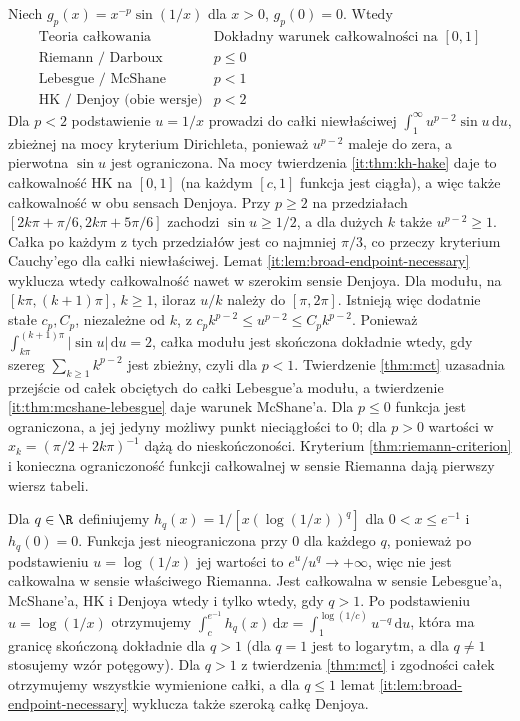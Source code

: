 \begin{przyklad}
Niech $g_p(x)=x^{-p}\sin(1/x)$ dla $x>0$, $g_p(0)=0$. Wtedy
\[
\begin{array}{c|c}
\text{Teoria całkowania}&\text{Dokładny warunek całkowalności na }[0,1]\\\hline
\text{Riemann / Darboux}&p\le0\\
\text{Lebesgue / McShane}&p<1\\
\text{HK / Denjoy (obie wersje)}&p<2
\end{array}
\]
Dla $p<2$ podstawienie $u=1/x$ prowadzi do całki niewłaściwej $\int_1^\infty u^{p-2}\sin u\,\mathrm du$, zbieżnej na mocy kryterium Dirichleta, ponieważ $u^{p-2}$ maleje do zera, a pierwotna $\sin u$ jest ograniczona. Na mocy twierdzenia \ref{it:thm:kh-hake} daje to całkowalność HK na $[0,1]$ (na każdym $[c,1]$ funkcja jest ciągła), a więc także całkowalność w obu sensach Denjoya. Przy $p\ge2$ na przedziałach $[2k\pi+\pi/6,2k\pi+5\pi/6]$ zachodzi $\sin u\ge1/2$, a dla dużych $k$ także $u^{p-2}\ge1$. Całka po każdym z tych przedziałów jest co najmniej $\pi/3$, co przeczy kryterium Cauchy'ego dla całki niewłaściwej. Lemat \ref{it:lem:broad-endpoint-necessary} wyklucza wtedy całkowalność nawet w szerokim sensie Denjoya. Dla modułu, na $[k\pi,(k+1)\pi]$, $k\ge1$, iloraz $u/k$ należy do $[\pi,2\pi]$. Istnieją więc dodatnie stałe $c_p,C_p$, niezależne od $k$, z $c_pk^{p-2}\le u^{p-2}\le C_pk^{p-2}$. Ponieważ $\int_{k\pi}^{(k+1)\pi}|\sin u|\,\mathrm du=2$, całka modułu jest skończona dokładnie wtedy, gdy szereg $\sum_{k\ge1} k^{p-2}$ jest zbieżny, czyli dla $p<1$. Twierdzenie \ref{thm:mct} uzasadnia przejście od całek obciętych do całki Lebesgue'a modułu, a twierdzenie \ref{it:thm:mcshane-lebesgue} daje warunek McShane'a. Dla $p\le0$ funkcja jest ograniczona, a jej jedyny możliwy punkt nieciągłości to $0$; dla $p>0$ wartości w $x_k=(\pi/2+2k\pi)^{-1}$ dążą do nieskończoności. Kryterium \ref{thm:riemann-criterion} i konieczna ograniczoność funkcji całkowalnej w sensie Riemanna dają pierwszy wiersz tabeli.
\end{przyklad}
\begin{przyklad}
Dla $q\in\R$ definiujemy $h_q(x)=1/[x(\log(1/x))^q]$ dla $0<x\le e^{-1}$ i $h_q(0)=0$. Funkcja jest nieograniczona przy $0$ dla każdego $q$, ponieważ po podstawieniu $u=\log(1/x)$ jej wartości to $e^u/u^q\to+\infty$, więc nie jest całkowalna w sensie właściwego Riemanna. Jest całkowalna w sensie Lebesgue'a, McShane'a, HK i Denjoya wtedy i tylko wtedy, gdy $q>1$. Po podstawieniu $u=\log(1/x)$ otrzymujemy
$\int_c^{e^{-1}}h_q(x)\,\mathrm dx=\int_1^{\log(1/c)}u^{-q}\,\mathrm du$, która ma granicę skończoną dokładnie dla $q>1$ (dla $q=1$ jest to logarytm, a dla $q\ne1$ stosujemy wzór potęgowy). Dla $q>1$ z twierdzenia \ref{thm:mct} i zgodności całek otrzymujemy wszystkie wymienione całki, a dla $q\le1$ lemat \ref{it:lem:broad-endpoint-necessary} wyklucza także szeroką całkę Denjoya.
\end{przyklad}
